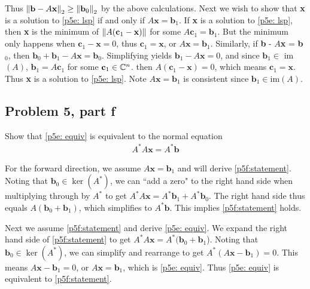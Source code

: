 \begin{solution}
Thus $\norm{\textbf{b} - A\textbf{x}}_2  \geq \norm{\textbf{b}_0}_2$ by the above calculations. Next we wish to show that \textbf{x} is a solution to \ref{p5e: lsp} if and only if $A\textbf{x} = \textbf{b}_1$. If \textbf{x} is a solution to \ref{p5e: lsp}, then \textbf{x} is the minimum of $\norm{A(\textbf{c}_1 - \textbf{x})}$ for some $A\textbf{c}_1 = \textbf{b}_1$. But the minimum only happens when $\textbf{c}_1 - \textbf{x} = 0$, thus $\textbf{c}_1 = \textbf{x}$, or $A\textbf{x} = \textbf{b}_1$. Similarly, if \textbf{b} - $A$\textbf{x} = \textbf{b}$_0$, then $\textbf{b}_0 + \textbf{b}_1 - A\textbf{x} = \textbf{b}_0$. Simplifying yields $\textbf{b}_1 - A\textbf{x} = 0$, and since $\textbf{b}_1 \in$ im$(A)$, $\textbf{b}_1 = A\textbf{c}_1$ for some $\textbf{c}_1 \in \mathbb{C}^n$. then $A(\textbf{c}_1 - \textbf{x}) = 0$, which means $\textbf{c}_1 = \textbf{x}.$ Thus \textbf{x} is a solution to \ref{p5e: lsp}. Note $A\textbf{x} = \textbf{b}_1$ is consistent since $\textbf{b}_1 \in $im$(A)$.
\end{solution}

\newpage
\subsection{Problem 5, part f}
Show that \ref{p5e: equiv} is equivalent to the normal equation
\begin{align}
A^*A\textbf{x} = A^*\textbf{b} \label{p5f:statement} 
\end{align}


\partbreak
\begin{solution}

For the forward direction, we assume $A\textbf{x} = \textbf{b}_1$ and will derive \ref{p5f:statement}. Noting that $\textbf{b}_0 \in \ker(A^*)$, we can ``add a zero"  to the right hand side when multiplying through by $A^*$ to get  $A^*A\textbf{x} = A^*\textbf{b}_1 + A^*\textbf{b}_0$. The right hand side thus equals $A(\textbf{b}_0 + \textbf{b}_1)$, which simplifies to $A^*\textbf{b}$. This implies \ref{p5f:statement} holds. 

\jump
Next we assume \ref{p5f:statement} and derive \ref{p5e: equiv}.  We expand the right hand side of \ref{p5f:statement} to get $A^*A\textbf{x} = A^*(\textbf{b}_0 + \textbf{b}_1$). Noting that $\textbf{b}_0 \in \ker(A^*)$, we can simplify and rearrange to get $A^*(A\textbf{x} - \textbf{b}_1) = 0$. This means $A\textbf{x} - \textbf{b}_1 = 0$, or $A\textbf{x} = \textbf{b}_1$, which is \ref{p5e: equiv}. Thus \ref{p5e: equiv} is equivalent to \ref{p5f:statement}.
\end{solution}

